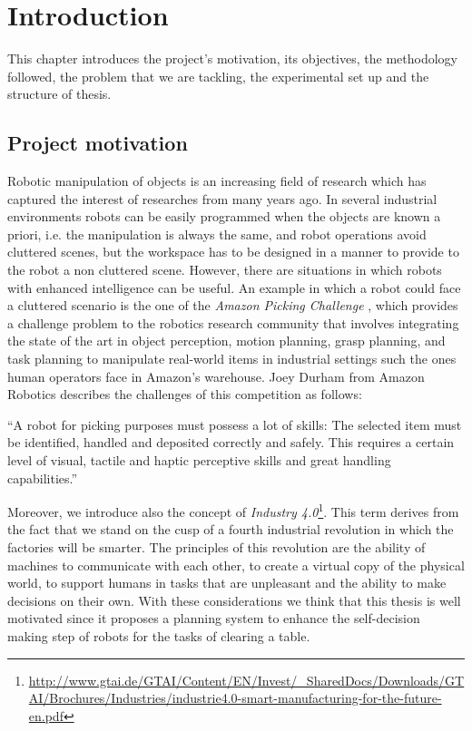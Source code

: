 
\chapter{Introduction}
\label{ch:introduction}

This chapter introduces the project's motivation, its objectives, the methodology followed, the problem that we are tackling, the experimental set up and the structure of thesis.



\section{Project motivation}
Robotic manipulation of objects is an increasing field of research which has captured the interest of researches from many years ago. In several industrial environments robots can be easily programmed when the objects are known a priori, i.e. the manipulation is always the same, and robot operations avoid cluttered scenes, but the workspace has to be designed in a manner to provide to the robot a non cluttered scene. However, there are situations in which robots with enhanced intelligence can be useful.
 An example in which a robot could face a cluttered scenario is the one of the \textit{Amazon Picking Challenge} \citep{APC}, which provides a challenge problem to the robotics research community that involves integrating the state of the art in object perception, motion planning, grasp planning, and task planning to manipulate real-world items in industrial settings such the ones human operators face in Amazon's warehouse. Joey Durham from Amazon Robotics describes the challenges of this competition as follows:
\begin{displayquote}
 “A robot for picking purposes must possess a lot of skills: The selected item must be identified, handled and deposited correctly and safely. This requires a certain level of visual, tactile and haptic perceptive skills and great handling capabilities.”
\end{displayquote}

Moreover, we introduce also the concept of \textit{Industry 4.0}\footnote{\href{http://www.gtai.de/GTAI/Content/EN/Invest/_SharedDocs/Downloads/GTAI/Brochures/Industries/industrie4.0-smart-manufacturing-for-the-future-en.pdf}{\url{http://www.gtai.de/GTAI/Content/EN/Invest/_SharedDocs/Downloads/GTAI/Brochures/Industries/industrie4.0-smart-manufacturing-for-the-future-en.pdf}}}. This term derives from the fact that we stand on the cusp of a fourth industrial revolution in which the factories will be smarter. The principles of this revolution are the ability of machines to communicate with each other,  to create a virtual copy of the physical world, to support humans in tasks that are unpleasant and the ability to make decisions on their own. With these considerations we think that this thesis is well motivated since it proposes a planning system to enhance the self-decision making step of robots for the tasks of clearing a table.

